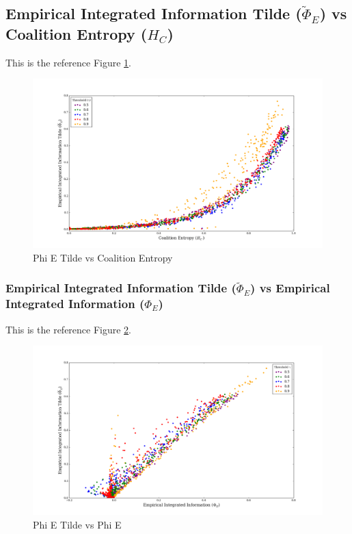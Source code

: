 \documentclass[a4paper,11pt]{article}
\begin{document}
\subsection{Empirical Integrated Information Tilde ($\widetilde{\Phi}_{E}$) vs Coalition Entropy ($H_C$)}

This is the reference Figure \ref{fig:phi-tilde-vs-hc-multi}.

\begin{figure}[H]
\begin{center}
\includegraphics[scale = 0.35]{figures/phi_tilde_vs_hc_multi}
\caption{
	Phi E Tilde vs Coalition Entropy
	\label{fig:phi-tilde-vs-hc-multi}
}
\end{center}
\end{figure}


\subsubsection{Empirical Integrated Information Tilde ($\widetilde{\Phi}_{E}$) vs Empirical Integrated Information ($\Phi_{E}$)}

This is the reference Figure \ref{fig:phi-tilde-vs-phi}.

\begin{figure}[H]
\begin{center}
\includegraphics[scale = 0.35]{figures/phi_tilde_vs_phi}
\caption{
	Phi E Tilde vs Phi E
	\label{fig:phi-tilde-vs-phi}
}
\end{center}
\end{figure}
\end{document}
